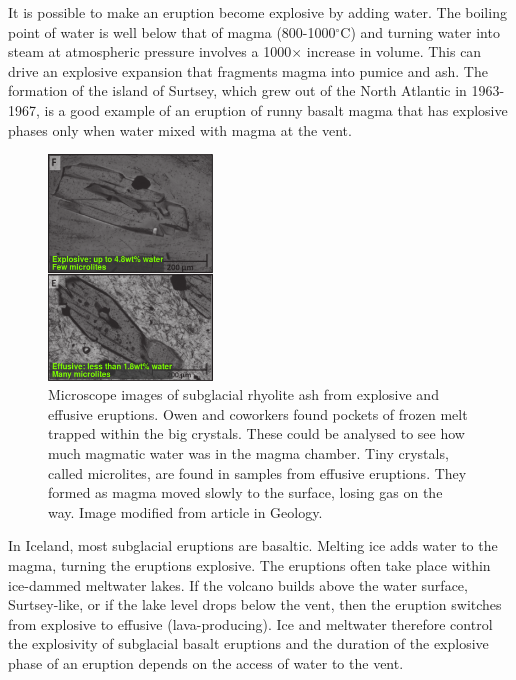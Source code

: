 \documentclass[a4paper,11pt]{article}
\begin{document}
It is possible to make an eruption become explosive by adding water. The boiling point of water is well below that of magma (800-1000$^{\circ}$C) and turning water into steam at atmospheric pressure involves a 1000$\times$ increase in volume. This can drive an explosive expansion that fragments magma into pumice and ash. The formation of the island of Surtsey, which grew out of the North Atlantic in 1963-1967, is a good example of an eruption of runny basalt magma that has explosive phases only when water mixed with magma at the vent.

\begin{figure}
\includegraphics[width=0.39\textwidth]{figures/m_both.png}
	\caption{Microscope images of subglacial rhyolite ash from explosive and effusive eruptions. Owen and coworkers found pockets of frozen melt trapped within the big crystals. These could be analysed to see how much magmatic water was in the magma chamber. Tiny crystals, called microlites, are found in samples from effusive eruptions. They formed as magma moved slowly to the surface, losing gas on the way. Image modified from article in Geology.}	
	\label{fig:inclusions}
\end{figure}

In Iceland, most subglacial eruptions are basaltic. Melting ice adds water to the magma, turning the eruptions explosive.  The eruptions often take place within ice-dammed meltwater lakes.  If the volcano builds above the water surface, Surtsey-like, or if the lake level drops below the vent, then the eruption switches from explosive to effusive (lava-producing). Ice and meltwater therefore control the explosivity of subglacial basalt eruptions and the duration of the explosive phase of an eruption depends on the access of water to the vent.
\end{document}
